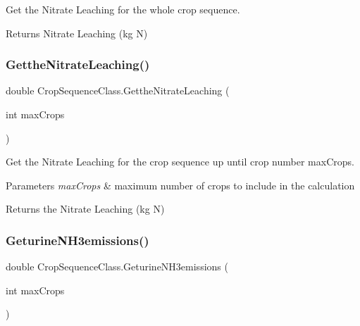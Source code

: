 Get the Nitrate Leaching for the whole crop sequence. 

\begin{DoxyReturn}{Returns}
Nitrate Leaching (kg N) 
\end{DoxyReturn}
\mbox{\label{class_crop_sequence_class_a1f7dcd7a44facc951bfea675eca18c9f}} 
\subsubsection{\texorpdfstring{GettheNitrateLeaching()}{GettheNitrateLeaching()}\hspace{0.1cm}{\footnotesize\ttfamily [2/2]}}
{\footnotesize\ttfamily double Crop\+Sequence\+Class.\+Getthe\+Nitrate\+Leaching (\begin{DoxyParamCaption}\item[{int}]{max\+Crops }\end{DoxyParamCaption})\hspace{0.3cm}{\ttfamily [inline]}}



Get the Nitrate Leaching for the crop sequence up until crop number max\+Crops. 


\begin{DoxyParams}{Parameters}
{\em max\+Crops} & maximum number of crops to include in the calculation \\
\hline
\end{DoxyParams}
\begin{DoxyReturn}{Returns}
the Nitrate Leaching (kg N) 
\end{DoxyReturn}
\mbox{\label{class_crop_sequence_class_a860cad5b4e23c37dee4bd95ecf59ffd5}} 
\subsubsection{\texorpdfstring{GeturineNH3emissions()}{GeturineNH3emissions()}}
{\footnotesize\ttfamily double Crop\+Sequence\+Class.\+Geturine\+N\+H3emissions (\begin{DoxyParamCaption}\item[{int}]{max\+Crops }\end{DoxyParamCaption})\hspace{0.3cm}{\ttfamily [inline]}}




